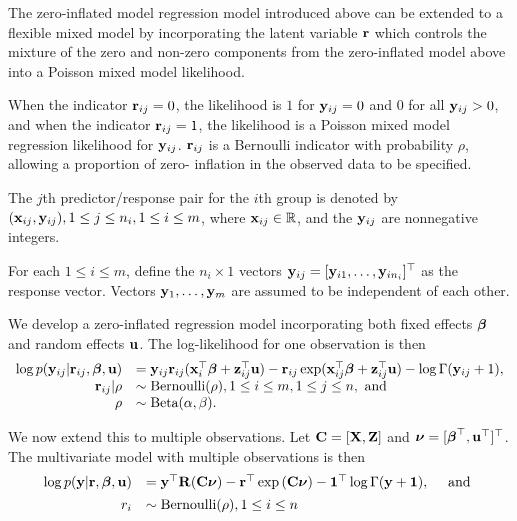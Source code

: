 The zero-inflated model regression model introduced above can be extended to a flexible mixed model by
incorporating the latent variable ${\bf r}$ which controls the mixture of the zero and non-zero components from
the zero-inflated model above into a Poisson mixed model likelihood.

When the indicator ${\bf r}_{ij} = 0$, the likelihood is $1$ for ${\bf y}_{ij} = 0$ and $0$ for all ${\bf y}_{ij} > 0$,
and when the indicator ${\bf r}_{ij} = 1$, the likelihood is a Poisson mixed model regression likelihood for
${\bf y}_{ij}$. ${\bf r}_{ij}$ is a Bernoulli indicator with probability $\rho$, allowing a proportion of zero-
inflation in the observed data to be specified.

The $j$th predictor/response pair for the $i$th group is denoted by $({\bf x}_{ij}, {\bf y}_{ij}), 1 \leq j \leq n_i, 1 \leq i \leq m$, where ${\bf x}_{ij} \in {\mathbb{R}}$, and the ${\bf y}_{ij}$ are nonnegative integers.

For each $1 \leq i \leq m$, define the $n_i \times 1$ vectors ${\bf y}_{ij} = [{\bf y}_{i 1}, \ldots, {\bf y}_{i
n_i}]^\top$ as the response vector. Vectors ${\bf y}_1, \ldots, {\bf y}_m$ are assumed to be independent of each other.

We develop a zero-inflated regression model incorporating both fixed effects ${\boldsymbol \beta}$ and random effects
${\bf u}$. The log-likelihood for one observation is then
\[
	\begin{array}{rl}
		\log p({\bf y}_{ij} | {\bf r}_{ij}, {\boldsymbol \beta}, {\bf u}) & = {\bf y}_{ij} {\bf r}_{ij} ({\bf x}_i^\top {\boldsymbol\beta} + {\bf z}_{ij}^\top {\bf u}) - {\bf r}_{ij} \exp ({\bf x}_{ij}^\top {\boldsymbol\beta} + {\bf z}_{ij}^\top {\bf u}) - \log \Gamma ({\bf y}_{ij} + 1), \\
		{\bf r}_{ij} | \rho                  & \sim \text{Bernoulli}(\rho), 1 \leq i \leq m, 1 \leq j \leq n, \text{ and }                                                              \\
		\rho                        & \sim \text{Beta}(\alpha, \beta).                                                                                              \\
	\end{array}
\]

\noindent We now extend this to multiple observations. Let ${\bf C} = [{\bf X}, {\bf Z}]$ and ${\boldsymbol \nu} = [{\boldsymbol \beta}^\top, {\bf u}^\top]^\top$. The multivariate model with multiple observations is then
\begin{equation}\label{eq:main}
	\begin{array}{rl}
		\log{p({\bf y}|{\bf r}, {\boldsymbol\beta}, {\bf u})} & = {\bf y}^\top {\bf R} ({\bf C}{\boldsymbol \nu}) - {\bf r}^\top \exp{({\bf C}{\boldsymbol\nu})} - {\bf 1}^\top \log{\Gamma{({\bf y}+ {\bf1})}}, \quad \mbox{ and } \\ [1ex]
		r_i                           & \sim \text{Bernoulli}(\rho), 1 \leq i \leq n                                                                     \\
	\end{array}
\end{equation}

